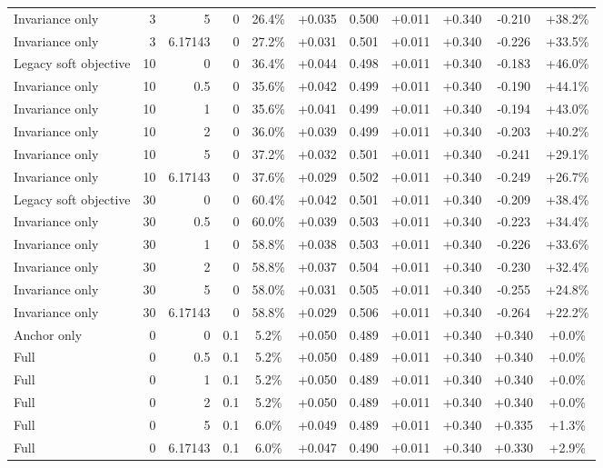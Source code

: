 \begin{table}[htbp]
\begin{tabular}{lrrrccccccc}
Invariance only & 3 & 5 & 0 & 26.4\% & +0.035 & 0.500 & +0.011 & +0.340 & -0.210 & +38.2\% \\
Invariance only & 3 & 6.17143 & 0 & 27.2\% & +0.031 & 0.501 & +0.011 & +0.340 & -0.226 & +33.5\% \\
Legacy soft objective & 10 & 0 & 0 & 36.4\% & +0.044 & 0.498 & +0.011 & +0.340 & -0.183 & +46.0\% \\
Invariance only & 10 & 0.5 & 0 & 35.6\% & +0.042 & 0.499 & +0.011 & +0.340 & -0.190 & +44.1\% \\
Invariance only & 10 & 1 & 0 & 35.6\% & +0.041 & 0.499 & +0.011 & +0.340 & -0.194 & +43.0\% \\
Invariance only & 10 & 2 & 0 & 36.0\% & +0.039 & 0.499 & +0.011 & +0.340 & -0.203 & +40.2\% \\
Invariance only & 10 & 5 & 0 & 37.2\% & +0.032 & 0.501 & +0.011 & +0.340 & -0.241 & +29.1\% \\
Invariance only & 10 & 6.17143 & 0 & 37.6\% & +0.029 & 0.502 & +0.011 & +0.340 & -0.249 & +26.7\% \\
Legacy soft objective & 30 & 0 & 0 & 60.4\% & +0.042 & 0.501 & +0.011 & +0.340 & -0.209 & +38.4\% \\
Invariance only & 30 & 0.5 & 0 & 60.0\% & +0.039 & 0.503 & +0.011 & +0.340 & -0.223 & +34.4\% \\
Invariance only & 30 & 1 & 0 & 58.8\% & +0.038 & 0.503 & +0.011 & +0.340 & -0.226 & +33.6\% \\
Invariance only & 30 & 2 & 0 & 58.8\% & +0.037 & 0.504 & +0.011 & +0.340 & -0.230 & +32.4\% \\
Invariance only & 30 & 5 & 0 & 58.0\% & +0.031 & 0.505 & +0.011 & +0.340 & -0.255 & +24.8\% \\
Invariance only & 30 & 6.17143 & 0 & 58.8\% & +0.029 & 0.506 & +0.011 & +0.340 & -0.264 & +22.2\% \\
Anchor only & 0 & 0 & 0.1 & 5.2\% & +0.050 & 0.489 & +0.011 & +0.340 & +0.340 & +0.0\% \\
Full & 0 & 0.5 & 0.1 & 5.2\% & +0.050 & 0.489 & +0.011 & +0.340 & +0.340 & +0.0\% \\
Full & 0 & 1 & 0.1 & 5.2\% & +0.050 & 0.489 & +0.011 & +0.340 & +0.340 & +0.0\% \\
Full & 0 & 2 & 0.1 & 5.2\% & +0.050 & 0.489 & +0.011 & +0.340 & +0.340 & +0.0\% \\
Full & 0 & 5 & 0.1 & 6.0\% & +0.049 & 0.489 & +0.011 & +0.340 & +0.335 & +1.3\% \\
Full & 0 & 6.17143 & 0.1 & 6.0\% & +0.047 & 0.490 & +0.011 & +0.340 & +0.330 & +2.9\% \\

\end{tabular}
\end{table}
